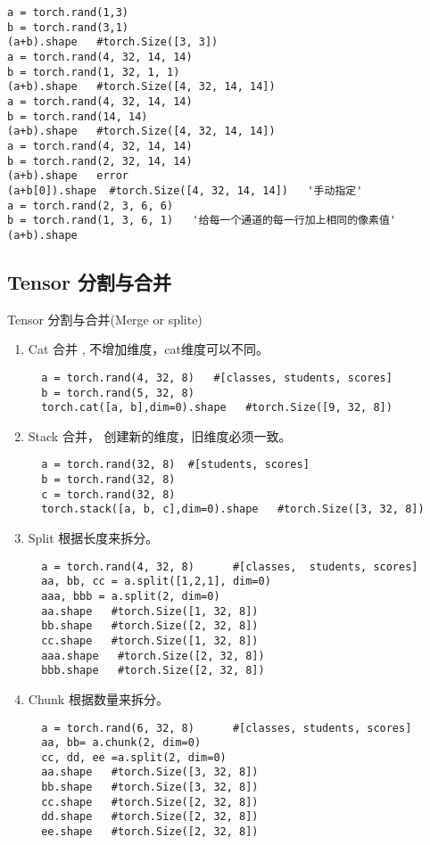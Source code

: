 \begin{lstlisting}
a = torch.rand(1,3)
b = torch.rand(3,1)
(a+b).shape   #torch.Size([3, 3])
a = torch.rand(4, 32, 14, 14)
b = torch.rand(1, 32, 1, 1)
(a+b).shape   #torch.Size([4, 32, 14, 14])
a = torch.rand(4, 32, 14, 14)
b = torch.rand(14, 14)
(a+b).shape   #torch.Size([4, 32, 14, 14])
a = torch.rand(4, 32, 14, 14)
b = torch.rand(2, 32, 14, 14)
(a+b).shape   error
(a+b[0]).shape  #torch.Size([4, 32, 14, 14])   '手动指定'
a = torch.rand(2, 3, 6, 6)
b = torch.rand(1, 3, 6, 1)   '给每一个通道的每一行加上相同的像素值'
(a+b).shape
\end{lstlisting}

\subsection{Tensor 分割与合并}
Tensor 分割与合并(Merge or splite)
\begin{enumerate}
  \item Cat 合并 , 不增加维度，cat维度可以不同。
  \begin{lstlisting}
  a = torch.rand(4, 32, 8)   #[classes, students, scores]
  b = torch.rand(5, 32, 8)
  torch.cat([a, b],dim=0).shape   #torch.Size([9, 32, 8])
  \end{lstlisting}
  \item Stack 合并， 创建新的维度，旧维度必须一致。
  \begin{lstlisting}
  a = torch.rand(32, 8)  #[students, scores]
  b = torch.rand(32, 8)
  c = torch.rand(32, 8)
  torch.stack([a, b, c],dim=0).shape   #torch.Size([3, 32, 8])
  \end{lstlisting}
  \item Split 根据长度来拆分。
  \begin{lstlisting}
  a = torch.rand(4, 32, 8)      #[classes,  students, scores]
  aa, bb, cc = a.split([1,2,1], dim=0)
  aaa, bbb = a.split(2, dim=0)
  aa.shape   #torch.Size([1, 32, 8])
  bb.shape   #torch.Size([2, 32, 8])
  cc.shape   #torch.Size([1, 32, 8])
  aaa.shape   #torch.Size([2, 32, 8])
  bbb.shape   #torch.Size([2, 32, 8])
  \end{lstlisting}
  \item Chunk  根据数量来拆分。
  \begin{lstlisting}
  a = torch.rand(6, 32, 8)      #[classes, students, scores]
  aa, bb= a.chunk(2, dim=0)
  cc, dd, ee =a.split(2, dim=0)
  aa.shape   #torch.Size([3, 32, 8])
  bb.shape   #torch.Size([3, 32, 8])
  cc.shape   #torch.Size([2, 32, 8])
  dd.shape   #torch.Size([2, 32, 8])
  ee.shape   #torch.Size([2, 32, 8])
  \end{lstlisting}
\end{enumerate}

